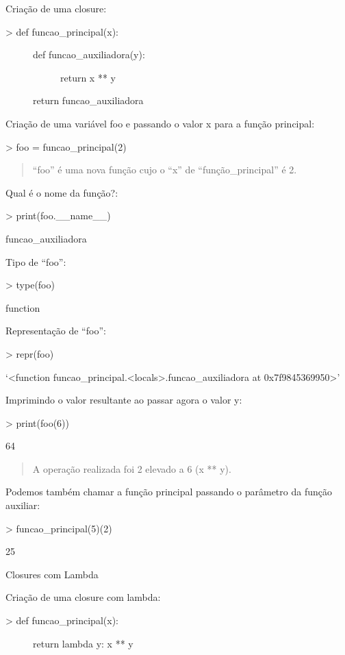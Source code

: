 \documentclass[letterpaper,10pt,brazil]{sphinxmanual}
\begin{document}
Criação de uma closure:
\begin{description}
\item[{\textgreater{} def funcao\_principal(x):}] \leavevmode\begin{description}
\item[{def funcao\_auxiliadora(y):}] \leavevmode
return x ** y

\end{description}

return funcao\_auxiliadora

\end{description}

Criação de uma variável foo e passando o valor x para a função principal:

\textgreater{} foo = funcao\_principal(2)
\begin{quote}

“foo” é uma nova função cujo o “x” de “função\_principal” é 2.
\end{quote}

Qual é o nome da função?:

\textgreater{} print(foo.\_\_name\_\_)

funcao\_auxiliadora

Tipo de “foo”:

\textgreater{} type(foo)

function

Representação de “foo”:

\textgreater{} repr(foo)

‘\textless{}function funcao\_principal.\textless{}locals\textgreater{}.funcao\_auxiliadora at 0x7f9845369950\textgreater{}’

Imprimindo o valor resultante ao passar agora o valor y:

\textgreater{} print(foo(6))

64
\begin{quote}

A operação realizada foi 2 elevado a 6 (x ** y).
\end{quote}

Podemos também chamar a função principal passando o parâmetro da função auxiliar:

\textgreater{} funcao\_principal(5)(2)

25

Closures com Lambda

Criação de uma closure com lambda:
\begin{description}
\item[{\textgreater{} def funcao\_principal(x):}] \leavevmode
return lambda y: x ** y

\end{description}
\end{document}
